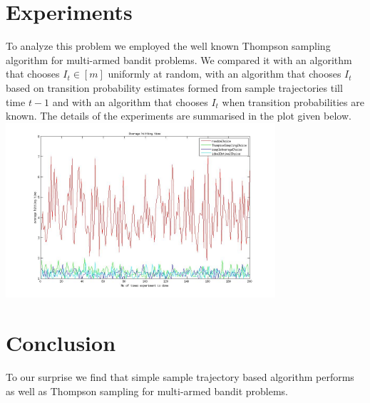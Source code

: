 \documentclass[a4paper,10pt]{article}
\begin{document}
\section*{Experiments}
To analyze this problem we employed the well known Thompson sampling algorithm for 
multi-armed bandit problems. We compared it with an algorithm that chooses 
$I_t \in [m]$ uniformly at random, with an algorithm that
chooses $I_t$ based on transition probability estimates formed from sample trajectories till
time $t-1$ and with an algorithm that chooses $I_t$ when transition probabilities are known.
The details of the experiments are summarised in the plot given below.
\includegraphics[width=100mm,scale=1]{AllObservationsKnownResult}
\section*{Conclusion}
To our surprise we find that simple sample trajectory based algorithm performs as well as
Thompson sampling for multi-armed bandit problems.
\nocite{*}


\end{document}
